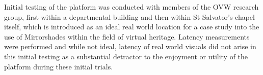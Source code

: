Initial testing of the platform was conducted with members of the OVW research group, first within a departmental building and then within St Salvator's chapel itself, which is introduced as an ideal real world location for a case study into the use of Mirrorshades within the field of virtual heritage. Latency measurements were performed and while not ideal, latency of real world visuals did not arise in this initial testing as a substantial detractor to the enjoyment or utility of the platform during these initial trials.

